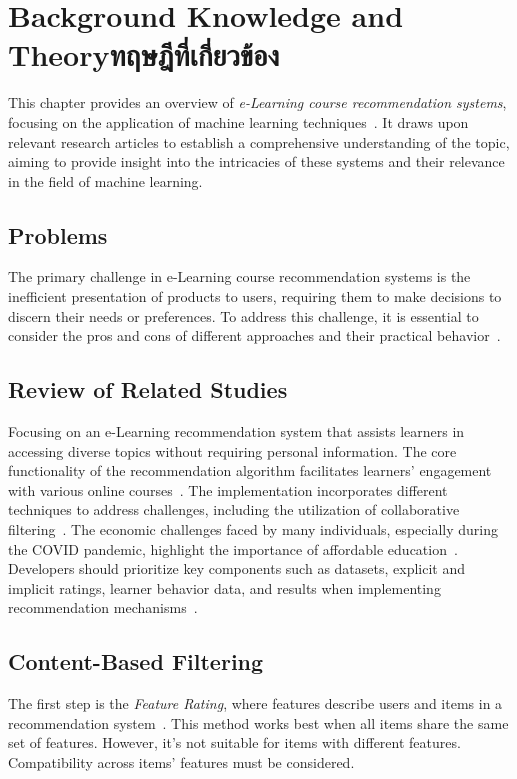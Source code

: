 \chapter{\ifenglish Background Knowledge and Theory\else ทฤษฎีที่เกี่ยวข้อง\fi}

This chapter provides an overview of \textit{e-Learning course recommendation systems}, focusing on 
the application of machine learning techniques~\cite{5432716}. It draws upon relevant research articles 
to establish a comprehensive understanding of the topic, aiming to provide insight into 
the intricacies of these systems and their relevance in the field of machine learning.

\section{Problems}

The primary challenge in e-Learning course recommendation systems is the inefficient presentation 
of products to users, requiring them to make decisions to discern their needs or preferences. 
To address this challenge, it is essential to consider the pros and cons of different approaches 
and their practical behavior~\cite{Bhaskaran2019}.

\section{Review of Related Studies}

Focusing on an e-Learning recommendation system that assists learners in accessing diverse topics 
without requiring personal information. The core functionality of the recommendation algorithm 
facilitates learners' engagement with various online courses~\cite{Tan2008}. The implementation 
incorporates different techniques to address challenges, including the utilization of collaborative 
filtering~\cite{Sharma2013}. The economic challenges faced by many individuals, especially 
during the COVID pandemic, highlight the importance of affordable education~\cite{Shishenhchi2010}. 
Developers should prioritize key components such as datasets, explicit and implicit ratings, learner 
behavior data, and results when implementing recommendation mechanisms~\cite{Khanal2020}.

\section{Content-Based Filtering}

The first step is the \textit{Feature Rating}, where features describe users and items in a 
recommendation system~\cite{features}. This method works best when all items share the same set of features. 
However, it's not suitable for items with different features. Compatibility across items' features 
must be considered.

